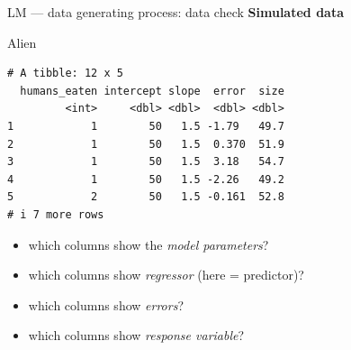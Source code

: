 \documentclass[
  10pt,
  ignorenonframetext,
  aspectratio=169,
  t]{beamer}
\newenvironment{Shaded}{\begin{snugshade}}{\end{snugshade}}
\newcommand{\NormalTok}[1]{\textcolor[rgb]{0.00,0.23,0.31}{#1}}
\providecommand{\tightlist}{%
  \setlength{\itemsep}{0pt}\setlength{\parskip}{0pt}}
\newcommand{\blueit}[1]{\textcolor{bluebeamer}{\emph{#1}}}
\newcommand{\bluebold}[1]{\textcolor{bluebeamer}{\textbf{#1}}}
\begin{document}
\begin{frame}[fragile]{LM --- data generating process: data check}
\protect{}\label{lm-data-generating-process-data-check}
\bluebold{Simulated data}

\footnotesize

\begin{Shaded}
\begin{Highlighting}[]
\NormalTok{Alien}
\end{Highlighting}
\end{Shaded}

\begin{verbatim}
# A tibble: 12 x 5
  humans_eaten intercept slope  error  size
         <int>     <dbl> <dbl>  <dbl> <dbl>
1            1        50   1.5 -1.79   49.7
2            1        50   1.5  0.370  51.9
3            1        50   1.5  3.18   54.7
4            1        50   1.5 -2.26   49.2
5            2        50   1.5 -0.161  52.8
# i 7 more rows
\end{verbatim}

\normalsize

\begin{itemize}
\tightlist
\item
  which columns show the \blueit{model parameters}?
\item
  which columns show \blueit{regressor} (here = predictor)?
\item
  which columns show \blueit{errors}?
\item
  which columns show \blueit{response variable}?
\end{itemize}
\end{frame}
\end{document}
